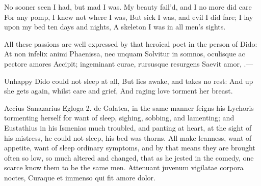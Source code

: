 {No sooner seen I had, but mad I was.
My beauty fail'd, and I no more did care
For any pomp, I knew not where I was,
But sick I was, and evil I did fare;
I lay upon my bed ten days and nights,
A skeleton I was in all men's sights.

All these passions are well expressed by that heroical poet in
the person of Dido:
At non infelix animi Phaenissa, nec unquam
Solvitur in somnos, oculisque ac pectore amores
Accipit; ingeminant curae, rursusque resurgens
Saevit amor, \etc{}.---

Unhappy Dido could not sleep at all,
But lies awake, and takes no rest:
And up she gets again, whilst care and grief,
And raging love torment her breast.

Accius Sanazarius Egloga 2. de Galatea, in the same manner feigns his
Lychoris tormenting herself for want of sleep, sighing, sobbing,
and lamenting; and Eustathius in his Ismenias much troubled, and 
panting at heart, at the sight of his mistress, he could not sleep, his
bed was thorns. All make leanness, want of appetite, want of
sleep ordinary symptoms, and by that means they are brought often so
low, so much altered and changed, that as he jested in the
comedy, one scarce know them to be the same men.
Attenuant juvenum vigilatae corpora noctes,
Curaque et immenso qui fit amore dolor.

}
